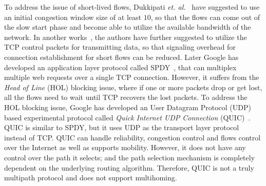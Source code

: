 To address the issue of short-lived flows, Dukkipati \textit{et. al.}~\cite{google-long-initcwnd} have suggested to use an initial congestion window size of at least $10$, so that the flows can come out of the slow start phase and become able to utilize the available bandwidth of the network. In another works~\cite{google-fast-open}, the authors have further suggested to utilize the TCP control packets for transmitting data, so that signaling overhead for connection establishment for short flows can be reduced. Later Google has developed an application layer protocol called SPDY~\cite{spdy}, that can multiplex multiple web requests over a single TCP connection. However, it suffers from the {\em Head of Line} (HOL) blocking issue, where if one or more packets drop or get lost, all the flows need to wait until TCP recovers the lost packets. To address the HOL blocking issue, Google has developed an User Datagram Protocol (UDP) based experimental protocol called {\em Quick Internet UDP Connection} (QUIC)~\cite{carlucci2015http,cui2017innovating}. QUIC is similar to SPDY, but it uses UDP as the transport layer protocol instead of TCP. QUIC can handle reliability, congestion control and flows control over the Internet as well as supports mobility. However, it does not have any control over the path it selects; and the path selection mechanism is completely dependent on the underlying routing algorithm. Therefore, QUIC is not a truly multipath protocol and does not support multihoming.


